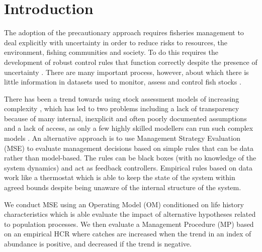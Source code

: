 \documentclass[12pt,doublespacing,a4paper]{ouparticle}
\begin{document}
\date{\today}

\keywords{}
 
\maketitle

\newpage


\linenumbers
\linespread{2}


\section{Introduction}

The adoption of the precautionary approach \citep[PA,][]{garcia1996precautionary} requires fisheries management to deal explicitly with uncertainty in order to reduce risks to resources, the environment, fishing communities and society. To do this requires the development of robust control rules that function correctly despite the presence of uncertainty \citep{radatz1990ieee, zhou1996robust}. There are many important process, however, about which there is little information in datasets used to monitor, assess and control fish stocks  \citep[e.g.][]{bjoernstad2004trends, botsford}.  

There has been a trend towards using stock assessment models of increasing complexity \citep[e.g][]{}, which has led to two problems including a lack of transparency because of many internal, inexplicit and often poorly documented assumptions and a lack of access, as only a few highly skilled modellers can run such complex models \citep{hilborn2003state}.  An alternative approach is to use Management Strategy Evaluation (MSE) to evaluate management decisions based on simple rules that can be data rather than model-based. The rules can be black boxes (with no knowledge of the system dynamics) and act as feedback controllers. Empirical rules based on data work like a thermostat which is able to keep the state of the system within agreed bounds despite being unaware of the internal structure of the system. 

We conduct MSE using an Operating Model (OM) conditioned on life history characteristics which is able evaluate the impact of alternative hypotheses related to population processes. We then evaluate a Management Procedure (MP) based on an empirical HCR where catches are increased when the trend in an index of abundance is positive, and decreased if the trend is negative. 
\end{document}
